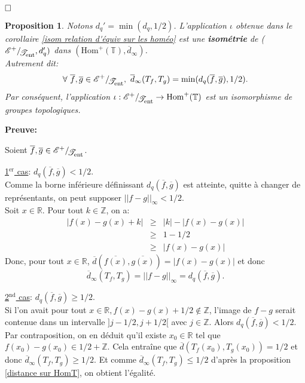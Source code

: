 \documentclass[11pt,a4 paper]{article}
\newtheorem{propriete}[theoreme]{Proposition}
\newtheorem{nota}[theoreme]{Notation}
\newcommand{\Tbb}{\mathbb{T}}
\newcommand{\Rbb}{\mathbb{R}}
\newcommand{\Zbb}{\mathbb{Z}}
\newcommand{\Ec}{\mathcal{E}}
\newcommand{\HomT}{\mathrm{Hom}^+(\Tbb)}
\newcommand{\Tent}{\mathcal{T}_{\mathrm{ent}}}
\newcommand*{\EnsembleQuotient}[2]%
{\ensuremath{%
		#1/\!\raisebox{-.65ex}{\ensuremath{\mathcal{#2}}}}}
\newenvironment{ppt}{\begin{box_ppt}\begin{propriete}}{\end{propriete}\end{box_ppt}}
\begin{document}
	 $\hfill \square$\\






\begin{ppt}
	Notons $d_q'=\min(d_q,1/2)$. L'application $\iota$ obtenue dans le corollaire \ref{isom relation d'équiv sur les homéo} est une \textbf{isométrie} de ($\EnsembleQuotient{\Ec^+}{\Tent}, d_q')$ dans $(\HomT,\overline{d}_\infty)$.\\
	Autrement dit:
	$$\forall\ \overline{f}, \overline{g} \in \EnsembleQuotient{\Ec^+}{\Tent},\ \overline{d}_\infty(T_f,T_g)=\min(d_q(\overline{f},\overline{g}), 1/2).$$
	Par conséquent, l'application $\iota:\EnsembleQuotient{\Ec^+}{\Tent}\to \HomT$ est un isomorphisme de groupes topologiques.
\end{ppt}

	\textbf{Preuve:}
	\par Soient $\overline{f}, \overline{g} \in \EnsembleQuotient{\Ec^+}{\Tent}$.
	
	\par \underline{1$^{\mathrm{er}}$ cas}: $d_q(\overline{f},\overline{g})<1/2$.\\
	 Comme la borne inférieure définissant $d_q(\overline{f},\overline{g})$ est atteinte, quitte à changer de représentants, on peut supposer $||f-g||_\infty<1/2$.\\
	Soit $x \in \Rbb$. Pour tout $k \in \Zbb$, on a:
	\begin{eqnarray*}
		|f(x)-g(x)+k|&\geq&|k|-|f(x)-g(x)|\\
			&\geq&1-1/2\\
			&\geq&|f(x)-g(x)|
	\end{eqnarray*} 
	Donc, pour tout $x \in \Rbb$, $\overline{d}(\overline{f(x)},\overline{g(x)})=|f(x)-g(x)|$ et donc $$\overline{d}_\infty(T_f,T_g)=||f-g||_\infty=d_q(\overline{f},\overline{g}).$$ 
			
	\par \underline{2$^{\mathrm{nd}}$ cas}: $d_q(\overline{f},\overline{g})\geq1/2$.\\
	Si l'on avait pour tout $x \in \Rbb, f(x)-g(x)+1/2 \notin \Zbb$, l'image de $f-g$ serait contenue dans un intervalle $]j-1/2,j+1/2[$ avec $j \in \Zbb$. Alors $d_q(\overline{f},\overline{g})<1/2$.\\
	Par contraposition, on en déduit qu'il existe $x_0 \in \Rbb$ tel que $f(x_0)-g(x_0) \in 1/2 +\Zbb$. Cela entraîne que $\overline{d}(T_f(x_0),T_g(x_0)) =1/2$ et donc $\overline{d}_\infty(T_f,T_g)\geq1/2$. Et comme $\overline{d}_\infty(T_f,T_g)\leq 1/2$ d'après la proposition \ref{distance sur HomT}, on obtient l'égalité.\\
	
\end{document}
